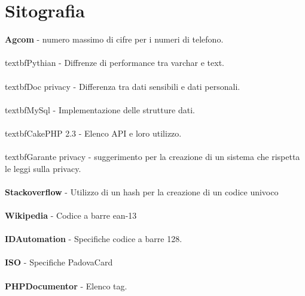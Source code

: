 \pagebreak
\section{Sitografia}

\textbf{Agcom} - numero massimo di cifre per i numeri di telefono.  \\ \\
textbf{Pythian} - Diffrenze di performance tra varchar e text.  \\ \\
textbf{Doc privacy} - Differenza tra dati sensibili e dati personali.  \\ \\ 
textbf{MySql} - Implementazione delle strutture dati.  \\ \\
textbf{CakePHP 2.3} - Elenco API e loro utilizzo.  \\ \\
textbf{Garante privacy} - suggerimento per la creazione di un sistema che rispetta le leggi sulla privacy.  \\ \\ 
\textbf{Stackoverflow} - Utilizzo di un hash per la creazione di un codice univoco   \\ \\
\textbf{Wikipedia} -  Codice a barre ean-13  \\ \\
\textbf{IDAutomation} - Specifiche codice a barre 128.  \\ \\ 
\textbf{ISO} - Specifiche PadovaCard  \\ \\
\textbf{PHPDocumentor} - Elenco tag. 